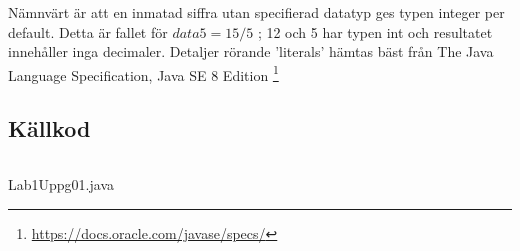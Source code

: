 
\par Nämnvärt är att en inmatad siffra utan specifierad datatyp ges typen
integer
per default. Detta är fallet för $data5 = 15 / 5$ ; 12 och 5 har typen int och
resultatet innehåller inga decimaler.  Detaljer rörande 'literals' hämtas bäst
från The Java Language Specification, Java SE 8 Edition
\footnote{\url{https://docs.oracle.com/javase/specs/}}



\subsection{Källkod}\label{subsection-1}
    \inputminted[linenos]{java}{src/Lab1Uppg01.java}
    \caption{Lab1Uppg01.java}
    \label{Uppg1src}

